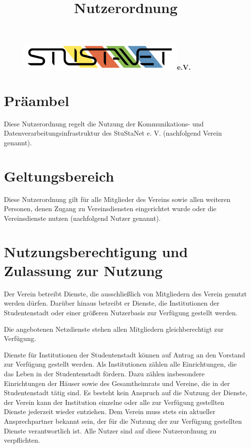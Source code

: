 \documentclass[a4paper,10pt]{scrartcl}
\title{Nutzerordnung}
\date{}
\begin{document}

\maketitle
\vspace{-60pt}

\begin{figure}[t!]
   \centering
   \vspace{-40pt}
   \mbox{\includegraphics[width=0.75\textwidth,keepaspectratio]{StuStaNet_Logo}\Huge \sffamily \textbf{e.V.}}
   \vspace{-40pt}
\end{figure}


\section*{Präambel}
Diese Nutzerordnung regelt die Nutzung der Kommunikations- und Datenverarbeitungsinfrastruktur des StuStaNet e. V. (nachfolgend Verein genannt).

\section{Geltungsbereich}
Diese Nutzerordnung gilt für alle Mitglieder des Vereins sowie allen weiteren Personen, denen Zugang zu Vereinsdiensten eingerichtet wurde oder die Vereinsdienste nutzen (nachfolgend Nutzer genannt).

\section{Nutzungsberechtigung und Zulassung zur Nutzung}
Der Verein betreibt Dienste, die ausschließlich von Mitgliedern des Verein genutzt werden dürfen. Darüber hinaus betreibt er Dienste, die Institutionen der Studentenstadt oder einer größeren Nutzerbasis zur Verfügung gestellt werden.

Die angebotenen Netzdienste stehen allen Mitgliedern gleichberechtigt zur Verfügung.

Dienste für Institutionen der Studentenstadt können auf Antrag an den Vorstand zur Verfügung gestellt werden. Als Institutionen zählen alle Einrichtungen, die das Leben in der Studentenstadt fördern. Dazu zählen insbesondere Einrichtungen der Häuser sowie des Gesamtheimrats und Vereine, die in der Studentenstadt tätig sind. 
Es besteht kein Anspruch auf die Nutzung der Dienste, der Verein kann der Institution einzelne oder alle zur Verfügung gestellten Dienste jederzeit wieder entziehen. Dem Verein muss stets ein aktueller Ansprechpartner bekannt sein, der für die Nutzung der zur Verfügung gestellten Dienste verantwortlich ist. Alle Nutzer sind auf diese Nutzerordnung zu verpflichten.
\end{document}
